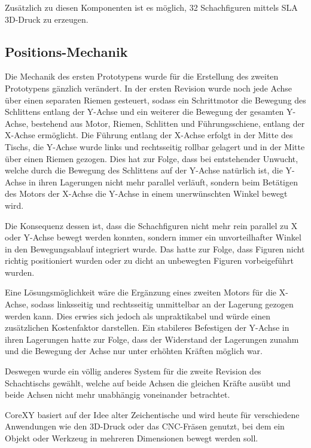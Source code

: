 Zusätzlich zu diesen Komponenten ist es möglich, 32 Schachfiguren
mittels SLA 3D-Druck zu erzeugen.

\hypertarget{positions-mechanik}{%
\subsection{Positions-Mechanik}\label{positions-mechanik}}

Die Mechanik des ersten Prototypens wurde für die Erstellung des zweiten
Prototypens gänzlich verändert. In der ersten Revision wurde noch jede
Achse über einen separaten Riemen gesteuert, sodass ein Schrittmotor die
Bewegung des Schlittens entlang der Y-Achse und ein weiterer die
Bewegung der gesamten Y-Achse, bestehend aus Motor, Riemen, Schlitten
und Führungsschiene, entlang der X-Achse ermöglicht. Die Führung entlang
der X-Achse erfolgt in der Mitte des Tischs, die Y-Achse wurde links und
rechtsseitig rollbar gelagert und in der Mitte über einen Riemen
gezogen. Dies hat zur Folge, dass bei entstehender Unwucht, welche durch
die Bewegung des Schlittens auf der Y-Achse natürlich ist, die Y-Achse
in ihren Lagerungen nicht mehr parallel verläuft, sondern beim Betätigen
des Motors der X-Achse die Y-Achse in einem unerwünschten Winkel bewegt
wird.

Die Konsequenz dessen ist, dass die Schachfiguren nicht mehr rein
parallel zu X oder Y-Achse bewegt werden konnten, sondern immer ein
unvorteilhafter Winkel in den Bewegungsablauf integriert wurde. Das
hatte zur Folge, dass Figuren nicht richtig positioniert wurden oder zu
dicht an unbewegten Figuren vorbeigeführt wurden.

Eine Lösungsmöglichkeit wäre die Ergänzung eines zweiten Motors für die
X-Achse, sodass linksseitig und rechtsseitig unmittelbar an der Lagerung
gezogen werden kann. Dies erwies sich jedoch als unpraktikabel und würde
einen zusätzlichen Kostenfaktor darstellen. Ein stabileres Befestigen
der Y-Achse in ihren Lagerungen hatte zur Folge, dass der Widerstand der
Lagerungen zunahm und die Bewegung der Achse nur unter erhöhten Kräften
möglich war.

Deswegen wurde ein völlig anderes System für die zweite Revision des
Schachtischs gewählt, welche auf beide Achsen die gleichen Kräfte ausübt
und beide Achsen nicht mehr unabhängig voneinander betrachtet.

CoreXY basiert auf der Idee alter Zeichentische und wird heute für
verschiedene Anwendungen wie den 3D-Druck oder das CNC-Fräsen genutzt,
bei dem ein Objekt oder Werkzeug in mehreren Dimensionen bewegt werden
soll.

